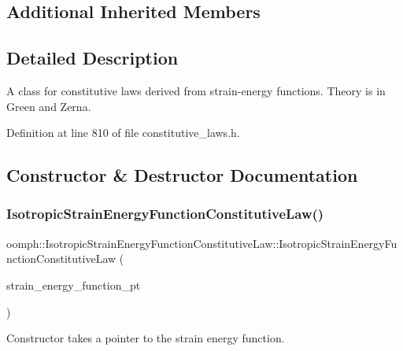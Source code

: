 \subsection*{Additional Inherited Members}


\subsection{Detailed Description}
A class for constitutive laws derived from strain-\/energy functions. Theory is in Green and Zerna. 

Definition at line 810 of file constitutive\+\_\+laws.\+h.



\subsection{Constructor \& Destructor Documentation}
\mbox{\label{classoomph_1_1IsotropicStrainEnergyFunctionConstitutiveLaw_aae7ab7763c630cb8296118da81fc5905}} 
\subsubsection{\texorpdfstring{Isotropic\+Strain\+Energy\+Function\+Constitutive\+Law()}{IsotropicStrainEnergyFunctionConstitutiveLaw()}}
{\footnotesize\ttfamily oomph\+::\+Isotropic\+Strain\+Energy\+Function\+Constitutive\+Law\+::\+Isotropic\+Strain\+Energy\+Function\+Constitutive\+Law (\begin{DoxyParamCaption}\item[{\hyperlink{classoomph_1_1StrainEnergyFunction}{Strain\+Energy\+Function} $\ast$const \&}]{strain\+\_\+energy\+\_\+function\+\_\+pt }\end{DoxyParamCaption})\hspace{0.3cm}{\ttfamily [inline]}}



Constructor takes a pointer to the strain energy function. 



